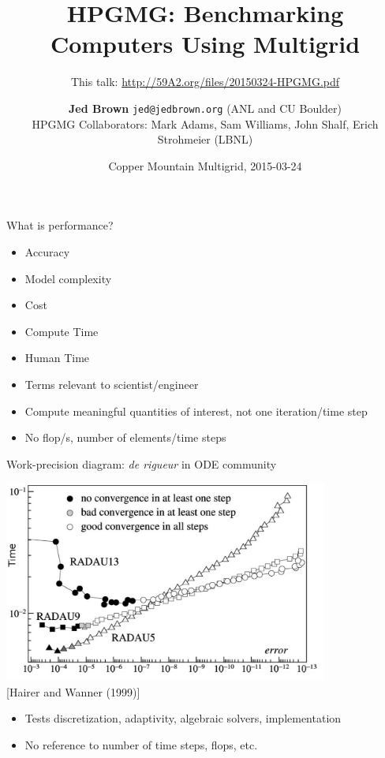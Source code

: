 \documentclass{beamer}
\title{HPGMG: Benchmarking Computers Using Multigrid}
\subtitle{This talk: \url{http://59A2.org/files/20150324-HPGMG.pdf}}
\author{{\bf Jed Brown} \texttt{jed@jedbrown.org} (ANL and CU Boulder)\\
{\small HPGMG Collaborators: Mark Adams, Sam Williams, John Shalf, Erich Strohmeier (LBNL)}}
\date{Copper Mountain Multigrid, 2015-03-24}
\begin{document}
\lstset{language=C}
\normalem

\begin{frame}
  \titlepage
\end{frame}

\begin{frame}{What is performance?}
  \begin{block}{}
    \begin{itemize}
    \item Accuracy
    \item Model complexity
    \item Cost
    \item Compute Time
    \item Human Time
    \end{itemize}
  \end{block}
  \begin{itemize}
  \item Terms relevant to scientist/engineer
  \item Compute meaningful quantities of interest, not one iteration/time step
  \item No flop/s, number of elements/time steps
  \end{itemize}
\end{frame}

\begin{frame}{Work-precision diagram: \emph{de rigueur} in ODE community}
  \begin{center}
    \includegraphics[width=0.8\textwidth]{figures/HairerWanner-WorkPrecision.png}\\
    {\scriptsize [Hairer and Wanner (1999)]}
  \end{center}
  \begin{itemize}
  \item Tests discretization, adaptivity, algebraic solvers, implementation
  \item No reference to number of time steps, flops, etc.
  \end{itemize}
\end{frame}
\end{document}
